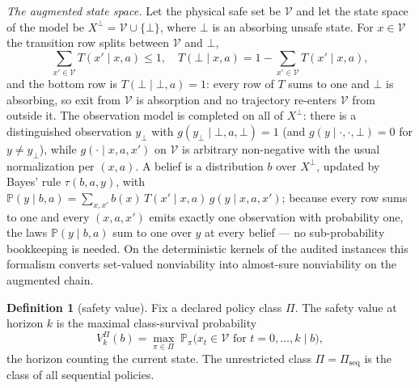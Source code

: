 \documentclass[10pt,twocolumn]{article}
\theoremstyle{plain}
\theoremstyle{definition}
\newtheorem{definition}[theorem]{Definition}
\theoremstyle{remark}
\begin{document}
\emph{The augmented state space.} Let the physical safe set be
\(\mathcal{V}\) and let the state space of the model be
\(X^{\perp} = \mathcal{V} \cup \{\bot\}\), where \(\bot\) is an absorbing
unsafe state. For \(x \in \mathcal{V}\) the transition row splits between
\(\mathcal{V}\) and \(\bot\),
\[
\textstyle\sum_{x' \in \mathcal{V}} T(x' \mid x, a) \le 1,\quad
T(\bot \mid x, a) = 1 - \sum_{x' \in \mathcal{V}} T(x' \mid x, a),
\]
and the bottom row is \(T(\bot \mid \bot, a) = 1\): every row of \(T\)
sums to one and \(\bot\) is absorbing, so exit from \(\mathcal{V}\) is
absorption and no trajectory re-enters \(\mathcal{V}\) from outside it.
The observation model is completed on all of \(X^{\perp}\): there is a
distinguished observation \(y_{\bot}\) with
\(g(y_{\bot} \mid \bot, a, \bot) = 1\) (and
\(g(y \mid \cdot, \cdot, \bot) = 0\) for \(y \ne y_{\bot}\)), while
\(g(\cdot \mid x, a, x')\) on \(\mathcal{V}\) is arbitrary non-negative
with the usual normalization per \((x, a)\). A belief is a distribution
\(b\) over \(X^{\perp}\), updated by Bayes' rule \(\tau(b, a, y)\), with
\(\mathbb{P}(y \mid b, a) = \sum_{x, x'} b(x)\, T(x' \mid x, a)\,
g(y \mid x, a, x')\); because every row sums to one and every
\((x, a, x')\) emits exactly one observation with probability one, the
laws \(\mathbb{P}(y \mid b, a)\) sum to one over \(y\) at every belief ---
no sub-probability bookkeeping is needed. On the deterministic kernels of
the audited instances this formalism converts set-valued nonviability into
almost-sure nonviability on the augmented chain.

\begin{definition}[safety value]\label{def:value}
Fix a declared policy class \(\Pi\). The safety value at horizon \(k\) is
the maximal class-survival probability
\[
V^{\Pi}_{k}(b) = \max_{\pi \in \Pi}\; \mathbb{P}_{\pi}\bigl( x_{t} \in
\mathcal{V} \text{ for } t = 0, \dots, k \;\big|\; b \bigr),
\]
the horizon counting the current state. The unrestricted class
\(\Pi = \Pi_{\mathrm{seq}}\) is the class of all sequential policies.
\end{definition}
\end{document}
